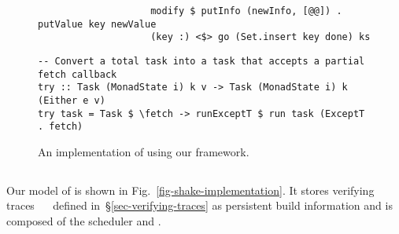 \begin{figure}
\begin{verbatim}
                    modify $ putInfo (newInfo, [@@]) . putValue key newValue
                    (key :) <$> go (Set.insert key done) ks
\end{verbatim}
\vspace{0mm}
\begin{verbatim}
-- Convert a total task into a task that accepts a partial fetch callback
try :: Task (MonadState i) k v -> Task (MonadState i) k (Either e v)
try task = Task $ \fetch -> runExceptT $ run task (ExceptT . fetch)
\end{verbatim}
\vspace{-2mm}
\caption{An implementation of \Excel using our framework.}\label{fig-excel-implementation}
\vspace{-5mm}
\end{figure}

\vspace{-1mm}
\subsection{\Shake}\label{sec-implementation-shake}
\vspace{-1mm}

Our model of \Shake is shown in Fig.~\ref{fig-shake-implementation}. It stores
verifying traces ~~ defined in~\S\ref{sec-verifying-traces}
as persistent build information and is composed of the  scheduler
and .

